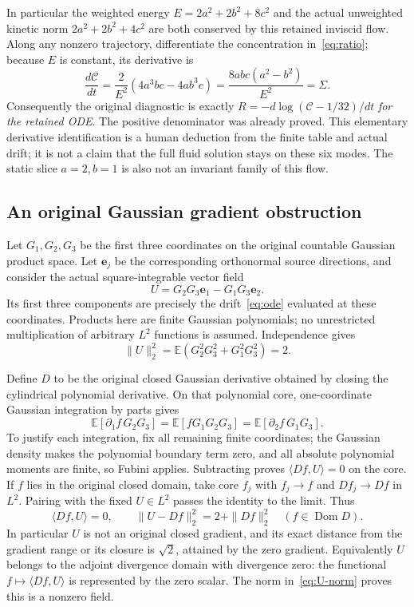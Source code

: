 \documentclass[11pt]{article}
\newcommand{\E}{\mathbb E}\newcommand{\Var}{\operatorname{Var}}
\begin{document}
In particular the weighted energy $E=2a^2+2b^2+8c^2$ and the
actual unweighted kinetic norm $2a^2+2b^2+4c^2$ are both conserved
by this retained inviscid flow. Along any nonzero trajectory,
differentiate the concentration in~\eqref{eq:ratio}; because $E$ is
constant, its derivative is
\[
 \frac{d\mathcal C}{dt}
  =\frac{2}{E^2}(4a^3bc-4ab^3c)
  =\frac{8abc(a^2-b^2)}{E^2}=\Sigma.
\]
Consequently the original diagnostic is exactly
$R=-d\log(\mathcal C-1/32)/dt$ \emph{for the retained ODE}.
The positive denominator was already proved. This elementary
derivative identification is a human deduction from the finite table
and actual drift; it is not a claim that the full fluid solution
stays on these six modes. The static slice $a=2,b=1$ is also not
an invariant family of this flow.

\subsection{An original Gaussian gradient obstruction}
Let $G_1,G_2,G_3$ be the first three coordinates on the original
countable Gaussian product space. Let $\mathbf e_j$ be the
corresponding orthonormal source directions, and consider the actual
square-integrable vector field
\[
 U=G_2G_3\mathbf e_1-G_1G_3\mathbf e_2.
\]
Its first three components are precisely the drift~\eqref{eq:ode}
evaluated at these coordinates. Products here are finite Gaussian
polynomials; no unrestricted multiplication of arbitrary $L^2$
functions is assumed. Independence gives
\begin{equation}\label{eq:U-norm}
 \|U\|_2^2=\E(G_2^2G_3^2+G_1^2G_3^2)=2.
\end{equation}

Define $D$ to be the original closed Gaussian derivative obtained by
closing the cylindrical polynomial derivative. On that polynomial
core, one-coordinate Gaussian integration by parts gives
\[
 \E[\partial_1 f\,G_2G_3]=\E[fG_1G_2G_3]
       =\E[\partial_2 f\,G_1G_3].
\]
To justify each integration, fix all remaining finite coordinates;
the Gaussian density makes the polynomial boundary term zero, and
all absolute polynomial moments are finite, so Fubini applies.
Subtracting proves $\langle Df,U\rangle=0$ on the core. If
$f$ lies in the original closed domain, take core $f_j$ with
$f_j\to f$ and $Df_j\to Df$ in $L^2$. Pairing with the fixed
$U\in L^2$ passes the identity to the limit. Thus
\begin{equation}\label{eq:U-orthogonal}
 \langle Df,U\rangle=0,\qquad
 \|U-Df\|_2^2=2+\|Df\|_2^2\quad(f\in\operatorname{Dom}D).
\end{equation}
In particular $U$ is not an original closed gradient, and its exact
distance from the gradient range or its closure is $\sqrt2$,
attained by the zero gradient. Equivalently $U$ belongs to the
adjoint divergence domain with divergence zero: the functional
$f\mapsto\langle Df,U\rangle$ is represented by the zero scalar.
The norm in~\eqref{eq:U-norm} proves this is a nonzero field.
\end{document}
